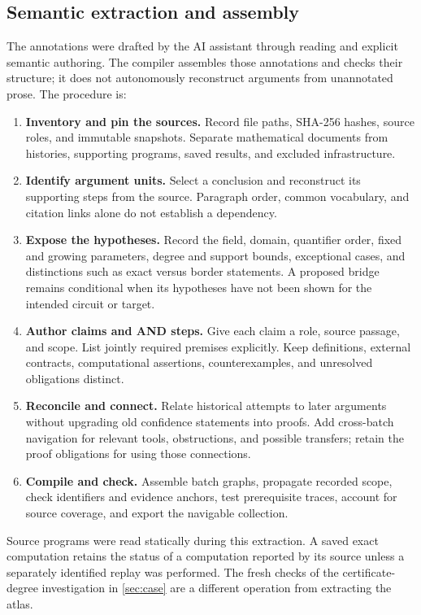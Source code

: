 \subsection{Semantic extraction and assembly}

The annotations were drafted by the AI assistant through reading and explicit semantic authoring. The compiler assembles those annotations and checks their structure; it does not autonomously reconstruct arguments from unannotated prose. The procedure is:

\begin{enumerate}[leftmargin=1.7em]
\item \textbf{Inventory and pin the sources.} Record file paths, SHA-256 hashes, source roles, and immutable snapshots. Separate mathematical documents from histories, supporting programs, saved results, and excluded infrastructure.
\item \textbf{Identify argument units.} Select a conclusion and reconstruct its supporting steps from the source. Paragraph order, common vocabulary, and citation links alone do not establish a dependency.
\item \textbf{Expose the hypotheses.} Record the field, domain, quantifier order, fixed and growing parameters, degree and support bounds, exceptional cases, and distinctions such as exact versus border statements. A proposed bridge remains conditional when its hypotheses have not been shown for the intended circuit or target.
\item \textbf{Author claims and AND steps.} Give each claim a role, source passage, and scope. List jointly required premises explicitly. Keep definitions, external contracts, computational assertions, counterexamples, and unresolved obligations distinct.
\item \textbf{Reconcile and connect.} Relate historical attempts to later arguments without upgrading old confidence statements into proofs. Add cross-batch navigation for relevant tools, obstructions, and possible transfers; retain the proof obligations for using those connections.
\item \textbf{Compile and check.} Assemble batch graphs, propagate recorded scope, check identifiers and evidence anchors, test prerequisite traces, account for source coverage, and export the navigable collection.
\end{enumerate}

Source programs were read statically during this extraction. A saved exact computation retains the status of a computation reported by its source unless a separately identified replay was performed. The fresh checks of the certificate-degree investigation in \cref{sec:case} are a different operation from extracting the atlas.

